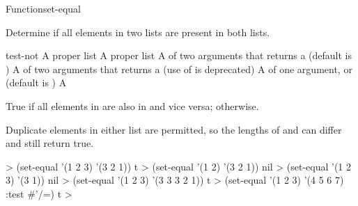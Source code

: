 \documentclass[10pt,twoside,english,pdftex]{article}
\begin{document}
\begin{functiondoc}{Function}{set-equal}{
     
    \returns{} }

\fnsyntax

\fnpurpose Determine if all elements in two lists are present in both lists.

\fnpackage {}

\fnmodule {}

\fnargs
\begin{args}{test-not}
\arg[list-1] A proper list
\arg[list-2] A proper list
\arg[test] A  of two arguments that returns a
 (default is ) 
 A  of two arguments that returns a
 (use of  is deprecated)
\arg[key] A  of one argument, or \nil{} (default is \nil)
\arg[boolean] A 
\end{args}

\fnreturns True if all elements in  are also in
 and vice versa; \nil{} otherwise.

\fndescription Duplicate elements in either list are permitted, so the
lengths of  and  can differ and still return
true.

\fnexamples
%
\W\supp
\begin{example}
  > (set-equal '(1 2 3) '(3 2 1))
  t
  > (set-equal '(1 2) '(3 2 1))
  nil\goodpagebreak
  > (set-equal '(1 2 3) '(3 1))
  nil
  > (set-equal '(1 2 3) '(3 3 3 2 1))
  t
  > (set-equal '(1 2 3) '(4 5 6 7) :test #'/=)
  t
  >
\end{example}

\end{functiondoc}

\end{document}
